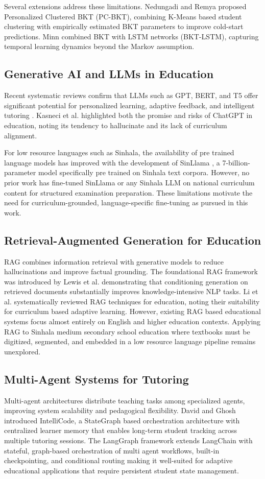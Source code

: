 \documentclass[conference]{IEEEtran}
\begin{document}
Several extensions address these limitations. Nedungadi and Remya \cite{b10} proposed Personalized Clustered BKT (PC-BKT), combining K-Means based student clustering with empirically estimated BKT parameters to improve cold-start predictions. Minn \cite{b11} combined BKT with LSTM networks (BKT-LSTM), capturing temporal learning dynamics beyond the Markov assumption.

\subsection{Generative AI and LLMs in Education}
Recent systematic reviews confirm that LLMs such as GPT, BERT, and T5 offer significant potential for personalized learning, adaptive feedback, and intelligent tutoring \cite{b12}. Kasneci et al. \cite{b13} highlighted both the promise and risks of ChatGPT in education, noting its tendency to hallucinate and its lack of curriculum alignment.

For low resource languages such as Sinhala, the availability of pre trained language models has improved with the development of SinLlama \cite{b5}, a 7-billion-parameter model specifically pre trained on Sinhala text corpora. However, no prior work has fine-tuned SinLlama or any Sinhala LLM on national curriculum content for structured examination preparation. These limitations motivate the need for curriculum-grounded, language-specific fine-tuning as pursued in this work.

\subsection{Retrieval-Augmented Generation for Education}
RAG combines information retrieval with generative models to reduce hallucinations and improve factual grounding. The foundational RAG framework was introduced by Lewis et al. \cite{b14} demonstrating that conditioning generation on retrieved documents substantially improves knowledge-intensive NLP tasks. Li et al. \cite{b15} systematically reviewed RAG techniques for education, noting their suitability for curriculum based adaptive learning. However, existing RAG based educational systems focus almost entirely on English and higher education contexts. Applying RAG to Sinhala medium secondary school education where textbooks must be digitized, segmented, and embedded in a low resource language pipeline remains unexplored.

\subsection{Multi-Agent Systems for Tutoring}
Multi-agent architectures distribute teaching tasks among specialized agents, improving system scalability and pedagogical flexibility. David and Ghosh \cite{b16} introduced IntelliCode, a StateGraph based orchestration architecture with centralized learner memory that enables long-term student tracking across multiple tutoring sessions. The LangGraph framework \cite{b17} extends LangChain with stateful, graph-based orchestration of multi agent workflows, built-in checkpointing, and conditional routing making it well-suited for adaptive educational applications that require persistent student state management.
\end{document}
